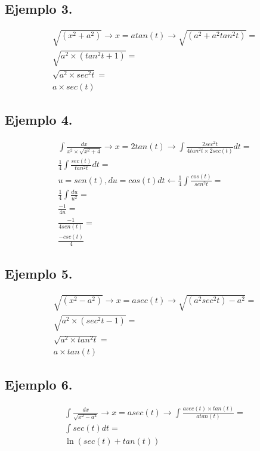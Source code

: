 \documentclass{article}
\begin{document}
\subsection{Ejemplo 3.}

\begin{eqnarray}
\sqrt {(x^{2}+a^{2})} \rightarrow x=atan(t)\rightarrow \sqrt {(a^{2}+a^{2}tan^{2}t)}  = \\
\sqrt {a^{2}\times (tan^{2}t+1)} = \\ 
\sqrt {a^{2} \times sec^{2}t } =\\
a \times sec(t)  
\end{eqnarray}

\subsection{Ejemplo 4.}

\begin{eqnarray}
\int \frac{dx}{x^{2}\times \sqrt{x^{2}+4}} \rightarrow x=2tan(t) \rightarrow \int \frac{2sec^{2}t}{4tan^{2}t \times2sec(t)}dt= \\
\frac{1}{4} \int \frac{sec(t)}{tan^{2}t}dt = \\
u=sen(t), du=cos(t)dt \leftarrow \frac{1}{4} \int \frac{cos(t)}{sen^{2}t}= \\
\frac{1}{4} \int  \frac{du}{u^{2}}=\\
\frac{-1}{4u}=\\
\frac{-1}{4sen(t)}=\\
\frac{-csc(t)}{4}
\end{eqnarray}

\subsection{Ejemplo 5.}

\begin{eqnarray}
\sqrt {(x^{2}-a^{2})} \rightarrow x=asec(t)\rightarrow \sqrt {(a^{2}sec^{2}t)-a^{2}}  = \\
\sqrt {a^{2}\times (sec^{2}t-1)} = \\ 
\sqrt {a^{2} \times tan^{2}t } =\\
a \times tan(t)  
\end{eqnarray}

\subsection{Ejemplo 6.}

\begin{eqnarray}
\int \frac{dx}{\sqrt{x^{2}-a^{2}}} \rightarrow x=asec(t) \rightarrow \int \frac{asec(t) \times tan(t)}{atan(t)}= \\
\int sec(t) dt= \\
\ln (sec(t)+tan(t))
\end{eqnarray}
\end{document}
